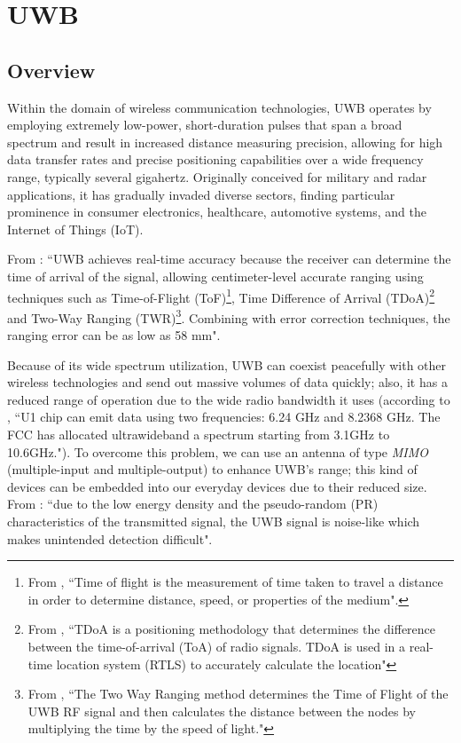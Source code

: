 \documentclass[english]{article}
\begin{document}
\section{UWB}\label{sec:uwb}
\subsection{Overview}
Within the domain of wireless communication technologies, UWB operates by employing extremely low-power, short-duration pulses that span a broad spectrum and result in increased distance measuring precision, allowing for high data transfer rates and precise positioning capabilities over a wide frequency range, typically several gigahertz. Originally conceived for military and radar applications, it has gradually invaded diverse sectors, finding particular prominence in consumer electronics, healthcare, automotive systems, and the Internet of Things (IoT).

From \cite{Coppens2022}: ``UWB achieves real-time accuracy because the receiver can determine the time of arrival of the signal, allowing centimeter-level accurate ranging using techniques such as Time-of-Flight (ToF)\footnote{From \cite{tof}, ``Time of flight is the measurement of time taken to travel a distance in order to determine distance, speed, or properties of the medium".}, Time Difference of Arrival (TDoA)\footnote{From \cite{tdoa}, ``TDoA is a positioning methodology that determines the difference between the time-of-arrival (ToA) of radio signals. TDoA is used in a real-time location system (RTLS) to accurately calculate the location"} and Two-Way Ranging (TWR)\footnote{From \cite{twr}, ``The Two Way Ranging method determines the Time of Flight of the UWB RF signal and then calculates the distance between the nodes by multiplying the time by the speed of light."}. Combining with error correction techniques, the ranging error can be as low as 58 mm".

Because of its wide spectrum utilization, UWB can coexist peacefully with other wireless technologies and send out massive volumes of data quickly; also, it has a reduced range of operation due to the wide radio bandwidth it uses (according to \cite{Zafar2019}, ``U1 chip can emit data using two frequencies: 6.24 GHz and 8.2368 GHz. The FCC has allocated ultrawideband a spectrum starting from 3.1GHz to 10.6GHz."). To overcome this problem, we can use an antenna of type \textit{MIMO} (multiple-input and multiple-output) to enhance UWB's range; this kind of devices can be embedded into our everyday devices due to their reduced size. From \cite{di2006uwb}: ``due to the low energy density and the pseudo-random (PR) characteristics of the transmitted signal, the UWB signal is noise-like which makes unintended detection difficult".
\end{document}
